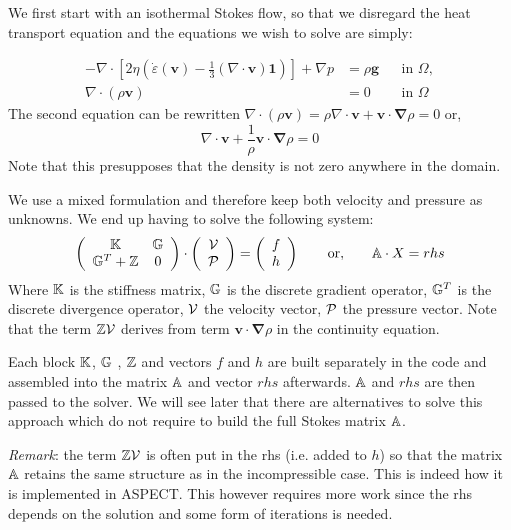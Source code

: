 We first start with an isothermal Stokes flow, so that we disregard the heat transport equation and 
the equations we wish to solve are simply:

\begin{align}
  \label{eq:stokes-1}
  -\nabla \cdot \left[2\eta \left(\dot\varepsilon(\bm v)
                                  - \frac{1}{3}(\nabla \cdot \bm v)\mathbf 1\right)
                \right] + \nabla p &=
  \rho \bm g
  &
  & \textrm{in $\Omega$},
  \\
  \label{eq:stokes-2}
  \nabla \cdot (\rho \bm v) &= 0
  &
  & \textrm{in $\Omega$}
\end{align}
The second equation can be rewritten 
$\nabla \cdot (\rho {\bm v}) =  \rho \nabla \cdot {\bm v} + {\bm v} \cdot {\bm \nabla}\rho=0$
or, 
\[
\nabla \cdot {\bm v} + \frac{1}{\rho} {\bm v} \cdot {\bm \nabla}\rho=0
\]
Note that this presupposes that the density is not zero anywhere in the domain.

We use a mixed formulation and therefore  
keep both velocity and pressure as unknowns. We end up having to solve 
the following system:
\[
\left(
\begin{array}{cc}
{\mathbb{K}} & {\mathbb{G}} \\ {\mathbb{G}}^T+{\mathbb{Z}} & 0 
\end{array}
\right)
\cdot
\left(
\begin{array}{c}
{\cal V} \\ {\cal P}
\end{array}
\right)
=
\left(
\begin{array}{c}
 f \\ h
\end{array}
\right)
\quad\quad
{\rm or,}
\quad\quad
{\mathbb{A}} \cdot X = rhs
\]
Where ${\mathbb{K}}$ is the stiffness matrix, ${\mathbb{G}}$ is the discrete gradient operator, 
${\mathbb{G}}^T$ is the discrete divergence operator, ${\cal V}$ the velocity vector, 
${\cal P}$ the pressure vector.
Note that the term ${\mathbb{Z}}{\cal V}$ derives from term ${\bm v} \cdot {\bm \nabla} \rho$ in the continuity equation. 

Each block ${\mathbb{K}}$, ${\mathbb{G}}$ , ${\mathbb{Z}}$ and vectors $f$ and $h$ are built separately 
in the code and assembled into 
the matrix ${\mathbb{A}}$ and vector $rhs$ afterwards. ${\mathbb{A}}$ and $rhs$ are then passed to the solver. 
We will see later that there are alternatives to solve this approach which do not require to 
build the full Stokes matrix ${\mathbb{A}}$. 

{\sl Remark}: the term ${\mathbb{Z}} {\cal V}$ is often put in the rhs (i.e. added to $h$) so that 
the matrix ${\mathbb{A}}$ retains the same structure as in the incompressible case. This is indeed 
how it is implemented in ASPECT. This however requires more work since the rhs depends 
on the solution and some form of iterations is needed. 

